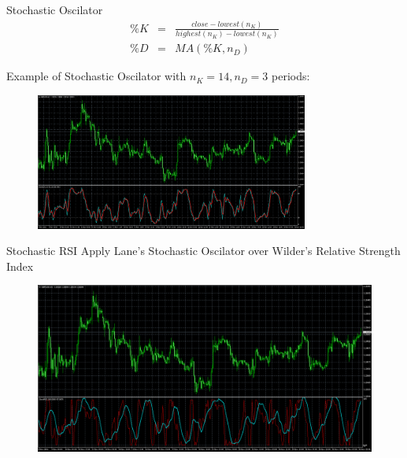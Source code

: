 \documentclass[12pt,portuguese]{beamer}
\begin{document}
\begin{frame}{Stochastic Oscilator}
\begin{equation*}
\begin{array}{rcl}
	\%K &=& \frac{close - lowest(n_K)}{highest(n_K) - lowest(n_K)}
\\
	\%D & = & MA(\%K, n_D)
\end{array}
\end{equation*}

	Example of Stochastic Oscilator \citep{Lane1984} with $n_K=14, n_D=3$ periods:
	\begin{figure}[H]
	\centering
	\includegraphics[width=0.8\textwidth]{images/mt4_stoch.png}
	\end{figure}
\end{frame}

\begin{frame}{Stochastic RSI}
	Apply Lane's Stochastic Oscilator over Wilder's Relative Strength Index

	\begin{figure}[H]
	\centering
	\includegraphics[width=\textwidth]{images/mt4_stochRSI.png}
	\end{figure}
\end{frame}
\end{document}
